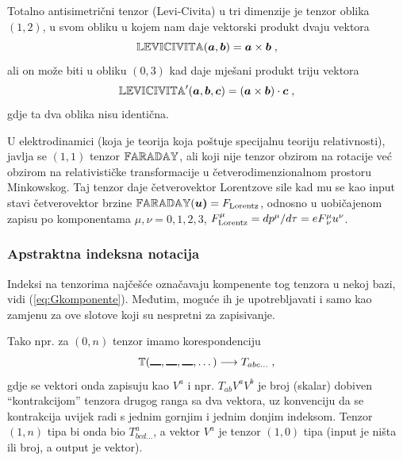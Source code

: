 Totalno antisimetrični tenzor (Levi-Civita) u tri dimenzije je
tenzor oblika $(1, 2)$, u svom obliku u kojem nam daje
vektorski produkt dvaju vektora
\begin{equation}
   \bbtensor{LEVICIVITA}(\vec{a}, \vec{b}) = \vec{a}\times\vec{b} \;,
\end{equation}
ali on može biti u obliku $(0, 3)$ kad daje mješani produkt 
triju vektora
\begin{equation}
   \bbtensor{LEVICIVITA}'(\vec{a}, \vec{b}, \vec{c}) =
 (\vec{a}\times\vec{b})\cdot\vec{c} \;,
\end{equation}
gdje ta dva oblika nisu identična.

U elektrodinamici (koja je teorija koja poštuje specijalnu teoriju
relativnosti), javlja se $(1,1)$ tenzor $\mathbb{FARADAY}$, ali koji
nije tenzor obzirom na rotacije
već obzirom na relativističke transformacije u četverodimenzionalnom
prostoru Minkowskog. Taj tenzor daje četverovektor Lorentzove sile
kad mu se kao input stavi četverovektor brzine
$\bbtensor{FARADAY}(\vec{u)} = F_{\rm Lorentz}$, odnosno u uobičajenom
zapisu po komponentama $\mu, \nu = 0,1,2,3$, 
$F^{\mu}_{\rm Lorentz} = d p^{\mu}/d\tau = e F^{\mu}_{\,\nu} u^\nu$.


\subsubsection*{Apstraktna indeksna notacija}

Indeksi na tenzorima najčešće označavaju kompenente tog tenzora
u nekoj bazi, vidi (\ref{eq:Gkomponente}). Međutim, moguće ih
je upotrebljavati i samo kao zamjenu za ove slotove koji su
nespretni za zapisivanje.

Tako npr.  za $(0, n)$ tenzor imamo korespondenciju
\begin{equation}
\bbtensor{T}(\slot,\slot,\slot, \dots)  \longrightarrow T_{abc\dots} \;,
\end{equation}
gdje se vektori onda zapisuju kao $V^a$ i npr.  $T_{ab}V^{a}V^{b}$ je
broj (skalar) dobiven ``kontrakcijom'' tenzora drugog ranga sa
dva vektora, uz konvenciju da se kontrakcija uvijek radi s jednim
gornjim i jednim donjim indeksom. Tenzor $(1,n)$ tipa bi onda bio
$T^{a}_{bcd\dots}$, a vektor $V^a$ je tenzor $(1,0)$ tipa (input
je ništa ili broj, a output je vektor).

